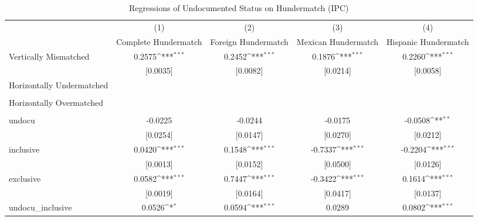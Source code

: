 \begin{table}[htbp]\centering
\def\sym#1{\ifmmode^{#1}\else\(^{#1}\)\fi}
\caption{Regressions of Undocumented Status on Hundermatch (IPC)}
\begin{tabular}{l*{4}{c}}
\toprule
                    &\multicolumn{1}{c}{(1)}         &\multicolumn{1}{c}{(2)}         &\multicolumn{1}{c}{(3)}         &\multicolumn{1}{c}{(4)}         \\
                    &Complete Hundermatch         &Foreign Hundermatch         &Mexican Hundermatch         &Hispanic Hundermatch         \\
\midrule
Vertically Mismatched&      0.2575\sym{***}&      0.2452\sym{***}&      0.1876\sym{***}&      0.2260\sym{***}\\
                    &    [0.0035]         &    [0.0082]         &    [0.0214]         &    [0.0058]         \\
\addlinespace
Horizontally Undermatched&                     &                     &                     &                     \\
                    &                     &                     &                     &                     \\
\addlinespace
Horizontally Overmatched&                     &                     &                     &                     \\
                    &                     &                     &                     &                     \\
\addlinespace
undocu              &     -0.0225         &     -0.0244         &     -0.0175         &     -0.0508\sym{**} \\
                    &    [0.0254]         &    [0.0147]         &    [0.0270]         &    [0.0212]         \\
\addlinespace
inclusive           &      0.0420\sym{***}&      0.1548\sym{***}&     -0.7337\sym{***}&     -0.2204\sym{***}\\
                    &    [0.0013]         &    [0.0152]         &    [0.0500]         &    [0.0126]         \\
\addlinespace
exclusive           &      0.0582\sym{***}&      0.7447\sym{***}&     -0.3422\sym{***}&      0.1614\sym{***}\\
                    &    [0.0019]         &    [0.0164]         &    [0.0417]         &    [0.0137]         \\
\addlinespace
undocu\_inclusive    &      0.0526\sym{*}  &      0.0594\sym{***}&      0.0289         &      0.0802\sym{***}\\

\end{tabular}
\end{table}
